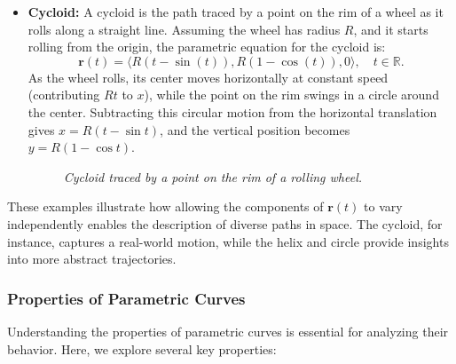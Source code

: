 \begin{itemize}
    \item \textbf{Cycloid:} A cycloid is the path traced by a point on the rim of a wheel as it rolls along a straight line. Assuming the wheel has radius \( R \), and it starts rolling from the origin, the parametric equation for the cycloid is:
    \[
    \mathbf{r}(t) = \langle R(t - \sin(t)), R(1 - \cos(t)), 0 \rangle, \quad t \in \mathbb{R}.
    \]
    As the wheel rolls, its center moves horizontally at constant speed (contributing \( Rt \) to \( x \)), while the point on the rim swings in a circle around the center. Subtracting this circular motion from the horizontal translation gives \( x = R(t - \sin t) \), and the vertical position becomes \( y = R(1 - \cos t) \).


    \begin{figure}[H]
        \centering
        \caption{\textit{Cycloid traced by a point on the rim of a rolling wheel.}}
        \label{fig:cycloid_param}
    \end{figure}

\end{itemize}

\noindent These examples illustrate how allowing the components of \( \mathbf{r}(t) \) to vary independently enables the description of diverse paths in space. The cycloid, for instance, captures a real-world motion, while the helix and circle provide insights into more abstract trajectories.





\subsubsection*{Properties of Parametric Curves}

\noindent Understanding the properties of parametric curves is essential for analyzing their behavior. Here, we explore several key properties:

